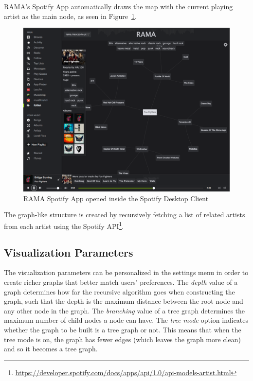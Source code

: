 \documentclass{article}
\begin{document}
      RAMA's Spotify App automatically draws the map with the current playing artist as the main node, as seen in Figure~\ref{fig:spotify_app}.
      \begin{figure}[hb]
        \begin{center}
          \includegraphics[width=\columnwidth]{../report/figures/graph_rootnode.pdf}
        \end{center}
        \caption{RAMA Spotify App opened inside the Spotify Desktop Client}
        \label{fig:spotify_app}
      \end{figure}
      The graph-like structure is created by recursively fetching a list of related artists from each artist using the Spotify API\footnote{\url{https://developer.spotify.com/docs/apps/api/1.0/api-models-artist.html}}.

    \subsection{Visualization Parameters}
    \label{sub:visualization_parameters}

      The visualization parameters can be personalized in the settings menu in order to create richer graphs that better match users' preferences.
      The \textit{depth} value of a graph determines how far the recursive algorithm goes when constructing the graph, such that the depth is the maximum distance between the root node and any other node in the graph.
      The \textit{branching} value of a tree graph determines the maximum number of child nodes a node can have.
      The \textit{tree mode} option indicates whether the graph to be built is a tree graph or not.
      This means that when the tree mode is on, the graph has fewer edges (which leaves the graph more clean) and so it becomes a tree graph.
\end{document}
